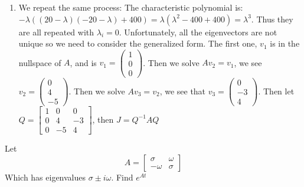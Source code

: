 \documentclass[11pt]{article}
\begin{document}
\begin{enumerate}
    \item We repeat the same process:
    The characteristic polynomial is:
    $-\lambda((20-\lambda)(-20-\lambda)+400) = \lambda(\lambda^2 - 400 + 400) = \lambda^3$.
    Thus they are all repeated with $\lambda_i = 0$. 
    Unfortunately, all the eigenvectors are not unique so we need to consider the generalized form.
    The first one, $v_1$ is in the nullspace of $A$, and is $v_1 = \begin{pmatrix}
        1 \\ 0 \\ 0
    \end{pmatrix}$. 
    Then we solve $A v_2 = v_1$, we see $v_2 = \begin{pmatrix}
        0 \\ 4 \\ -5
    \end{pmatrix}$.
    Then we solve $A v_3 = v_2$, we see that $v_3 = \begin{pmatrix}
        0 \\ -3 \\ 4
    \end{pmatrix}$.
    Then let $Q = \begin{bmatrix}
        1 & 0 & 0 \\
        0 & 4 & -3 \\
        0 & -5 & 4
    \end{bmatrix}$,
    then $J = Q^{-1}AQ$

\end{enumerate}


Let $$A = \begin{bmatrix}
    \sigma & \omega \\ -\omega & \sigma
\end{bmatrix}$$
Which has eigenvalues $\sigma \pm i \omega$. Find $e^{At}$
\soln
\end{document}
